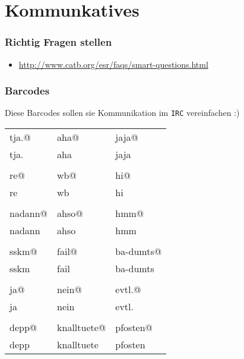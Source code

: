 \documentclass[oneside,12pt,a4paper]{scrartcl}
\makeatletter
\newcommand{\barcode}[1]{{\xlix@#1@}}
\newcommand{\linkitem}[1]{\item \url{#1}}
\makeatother
\begin{document}
\part{Kommunkatives}

\section{Richtig Fragen stellen}
\begin{itemize}
\linkitem{http://www.catb.org/esr/faqs/smart-questions.html}
\end{itemize}


\newpage
\section{Barcodes}
Diese Barcodes sollen sie Kommunikation im \texttt{IRC} vereinfachen :) \newline

\begin{tabularx}{\textwidth}{m{5cm}m{5cm}m{5cm}}
  \barcode{tja.} & \barcode{aha} & \barcode{jaja} \\
   tja. & aha & jaja \\

\\
  \barcode{re} & \barcode{wb} & \barcode{hi} \\
   re & wb & hi \\

\\
  \barcode{nadann} & \barcode{ahso} & \barcode{hmm} \\
   nadann & ahso & hmm \\

\\
  \barcode{sskm} & \barcode{fail} & \barcode{ba-dumts} \\
   sskm & fail & ba-dumts \\

\\
  \barcode{ja} & \barcode{nein} & \barcode{evtl.} \\
   ja & nein & evtl. \\

\\
  \barcode{depp} & \barcode{knalltuete} & \barcode{pfosten} \\
   depp & knalltuete & pfosten \\
\end{tabularx}
\end{document}
